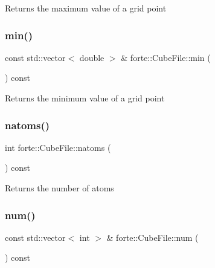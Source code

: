 \begin{DoxyReturn}{Returns}
the maximum value of a grid point 
\end{DoxyReturn}
\mbox{\label{classforte_1_1_cube_file_a4d045a770876626dc7d34ebc39ca0525}} 
\subsubsection{\texorpdfstring{min()}{min()}}
{\footnotesize\ttfamily const std\+::vector$<$ double $>$ \& forte\+::\+Cube\+File\+::min (\begin{DoxyParamCaption}{ }\end{DoxyParamCaption}) const}

\begin{DoxyReturn}{Returns}
the minimum value of a grid point 
\end{DoxyReturn}
\mbox{\label{classforte_1_1_cube_file_a9ad38a5a7b190ddb0a5e162755cecf59}} 
\subsubsection{\texorpdfstring{natoms()}{natoms()}}
{\footnotesize\ttfamily int forte\+::\+Cube\+File\+::natoms (\begin{DoxyParamCaption}{ }\end{DoxyParamCaption}) const}

\begin{DoxyReturn}{Returns}
the number of atoms 
\end{DoxyReturn}
\mbox{\label{classforte_1_1_cube_file_a0f2d624536eb4ecdca77092e0ac39ff8}} 
\subsubsection{\texorpdfstring{num()}{num()}}
{\footnotesize\ttfamily const std\+::vector$<$ int $>$ \& forte\+::\+Cube\+File\+::num (\begin{DoxyParamCaption}{ }\end{DoxyParamCaption}) const}

